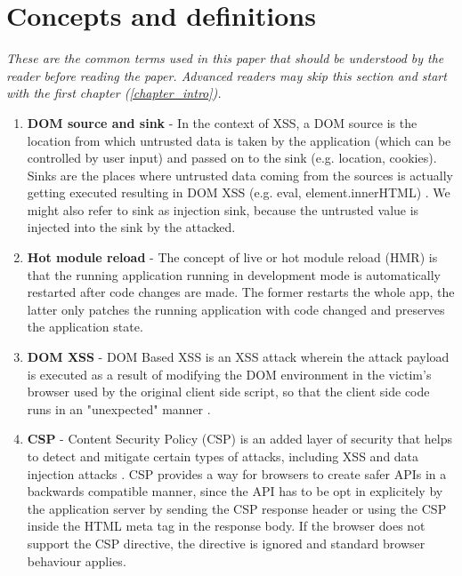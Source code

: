 \chapter*{Concepts and definitions} %
\label{definitions}

\textit{These are the common terms used in this paper that should be understood by the reader before
  reading the paper. Advanced readers may skip this section and start with the first chapter
  (\ref{chapter_intro}).}

\begin{enumerate}
  \item \label{def:dom_source_sink} \textbf{DOM source and sink} - In the context of XSS, a DOM
        source is the location from which untrusted data is taken by the application (which can be
        controlled by user input) and passed on to the sink (e.g. location, cookies). Sinks are the
        places where untrusted data coming from the sources is actually getting executed resulting
        in DOM XSS (e.g. eval, element.innerHTML) \cite{source_sink_definition}. We might also refer
        to sink as injection sink, because the untrusted value is injected into the sink by the
        attacked.
  \item \label{def:hot_reload} \textbf{Hot module reload} - The concept of live or hot module
        reload (HMR) is that the running application running in development mode is automatically
        restarted after code changes are made. The former restarts the whole app, the latter only
        patches the running application with code changed and preserves the application state.
  \item \label{def:dom_xss} \textbf{DOM XSS} - DOM Based XSS is an XSS attack wherein the attack
        payload is executed as a result of modifying the DOM environment in the victim's browser
        used by the original client side script, so that the client side code runs in an
        "unexpected" manner \cite{owasp_dom_xss_def}.
  \item \label{def:csp} \textbf{CSP} - Content Security Policy (CSP) is an added layer of security
        that helps to detect and mitigate certain types of attacks, including XSS and data injection
        attacks \cite{mdn_csp_def}. CSP provides a way for browsers to create safer APIs in a
        backwards compatible manner, since the API has to be opt in explicitely by the application
        server by sending the CSP response header or using the CSP inside the HTML meta tag in the
        response body. If the browser does not support the CSP directive, the directive is ignored
        and standard browser behaviour applies.
\end{enumerate}
